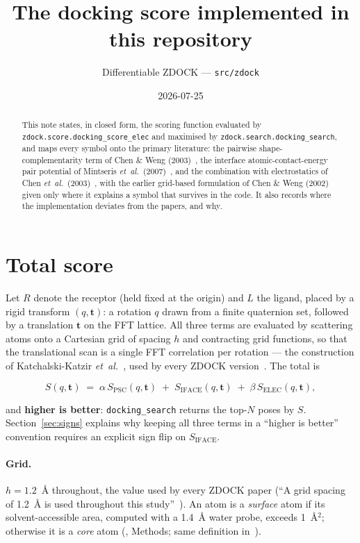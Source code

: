 \documentclass[11pt,a4paper]{article}
\title{The docking score implemented in this repository}
\author{Differentiable ZDOCK --- \texttt{src/zdock}}
\date{2026-07-25}
\newcommand{\Spsc}{S_{\mathrm{PSC}}}
\newcommand{\Siface}{S_{\mathrm{IFACE}}}
\newcommand{\Selec}{S_{\mathrm{ELEC}}}
\begin{document}
\maketitle

\begin{abstract}
This note states, in closed form, the scoring function evaluated by
\texttt{zdock.score.docking\_score\_elec} and maximised by
\texttt{zdock.search.docking\_search}, and maps every symbol onto the primary
literature: the pairwise shape-complementarity term of Chen \& Weng
(2003)~\cite{ChenWeng2003psc}, the interface atomic-contact-energy pair
potential of Mintseris \emph{et~al.}\ (2007)~\cite{Mintseris2007}, and the
combination with electrostatics of Chen \emph{et~al.}\
(2003)~\cite{Chen2003zdock}, with the earlier grid-based formulation of Chen
\& Weng (2002)~\cite{ChenWeng2002} given only where it explains a symbol that
survives in the code. It also records where the implementation deviates from
the papers, and why.
\end{abstract}

\section{Total score}

Let $R$ denote the receptor (held fixed at the origin) and $L$ the ligand,
placed by a rigid transform $(q,\mathbf{t})$: a rotation $q$ drawn from a
finite quaternion set, followed by a translation $\mathbf{t}$ on the FFT
lattice. All three terms are evaluated by scattering atoms onto a Cartesian
grid of spacing $h$ and contracting grid functions, so that the translational
scan is a single FFT correlation per rotation --- the construction of
Katchalski-Katzir \emph{et~al.}~\cite{Katchalski1992}, used by every ZDOCK
version~\cite{ChenWeng2002,ChenWeng2003psc,Chen2003zdock}. The total is

\begin{equation}
  S(q,\mathbf{t}) \;=\; \alpha\,\Spsc(q,\mathbf{t})
  \;+\; \Siface(q,\mathbf{t})
  \;+\; \beta\,\Selec(q,\mathbf{t}),
  \label{eq:total}
\end{equation}

and \textbf{higher is better}: \texttt{docking\_search} returns the top-$N$
poses by $S$. Section~\ref{sec:signs} explains why keeping all three terms in a
``higher is better'' convention requires an explicit sign flip on $\Siface$.

\paragraph{Grid.}
$h = 1.2$~\AA{} throughout, the value used by every ZDOCK paper
(``A grid spacing of 1.2~\AA{} is used throughout this
study''~\cite{ChenWeng2003psc}). An atom is a \emph{surface} atom if its
solvent-accessible area, computed with a 1.4~\AA{} water probe, exceeds
1~\AA$^2$; otherwise it is a \emph{core} atom (\cite{ChenWeng2003psc},
Methods; same definition in~\cite{ChenWeng2002}).
\end{document}
